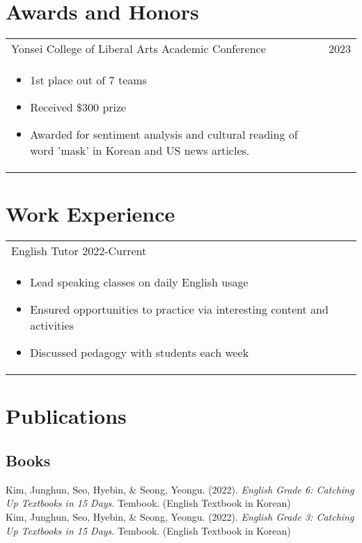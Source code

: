 \documentclass[11pt]{article}
\begin{document}
\section{Awards and Honors}
\begin{tabularx}{\textwidth}{X r}
Yonsei College of Liberal Arts Academic Conference & 2023 \\
\begin{minipage}[t]{\linewidth}
	\begin{itemize}[parsep=-6pt]
	\item 1st place out of 7 teams
	\item Received \$300 prize
	\item Awarded for sentiment analysis and cultural reading of word 'mask' in Korean and US news articles.
    \end{itemize}
\end{minipage} & \\
\end{tabularx}
\vspace{0.8cm}

\section{Work Experience} %
\begin{tabularx}{\textwidth}{X r}
English Tutor 2022-Current\\
\begin{minipage}[t]{\linewidth}
	\begin{itemize}[parsep=-6pt]
	\item Lead speaking classes on daily English usage
	\item Ensured opportunities to practice via interesting content and activities
	\item Discussed pedagogy with students each week
    \end{itemize}
\end{minipage} & \\
\end{tabularx}
\vspace{0.8cm}

\section{Publications} %
\subsection{Books}
Kim, Junghun, Seo, Hyebin, \& Seong, Yeongu. (2022). \textit{English Grade 6: Catching Up Textbooks in 15 Days}. Tembook. (English Textbook in Korean)\\
Kim, Junghun, Seo, Hyebin, \& Seong, Yeongu. (2022). \textit{English Grade 3: Catching Up Textbooks in 15 Days}. Tembook. (English Textbook in Korean)
\vspace{0.8cm}
\end{document}
